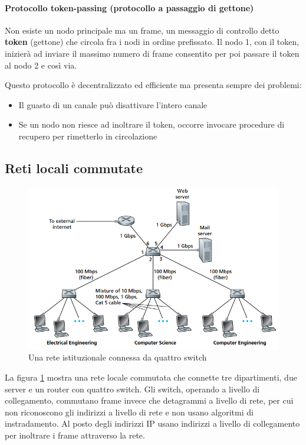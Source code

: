 \documentclass[11pt,a4paper]{article}
\begin{document}
\paragraph{Protocollo token-passing (protocollo a passaggio di gettone)}
Non esiste un nodo principale ma un frame, un messaggio di controllo detto \textbf{token} (gettone) che circola fra i nodi in ordine prefissato. Il nodo 1, con il token, inizierà ad inviare il massimo numero di frame consentito per poi passare il token al nodo 2 e così via.

Questo protocollo è decentralizzato ed efficiente ma presenta sempre dei problemi:
\begin{itemize}
	\item Il guasto di un canale può disattivare l'intero canale
	\item Se un nodo non riesce ad inoltrare il token, occorre invocare procedure di recupero per rimetterlo in circolazione
\end{itemize} 

\subsection{Reti locali commutate}
\begin{figure}
	\includegraphics[scale=0.55]{img/082.png}
	\caption{Una rete istituzionale connessa da quattro switch}
	\label{fig: 082}
\end{figure}
La figura \ref{fig: 082} mostra una rete locale commutata che connette tre dipartimenti, due server e un router con quattro switch. Gli switch, operando a livello di collegamento, commutano frame invece che detagrammi a livello di rete, per cui non riconoscono gli indirizzi a livello di rete e non usano algoritmi di instradamento. Al posto degli indirizzi IP usano indirizzi a livello di collegamento per inoltrare i frame attraverso la rete.
\end{document}
